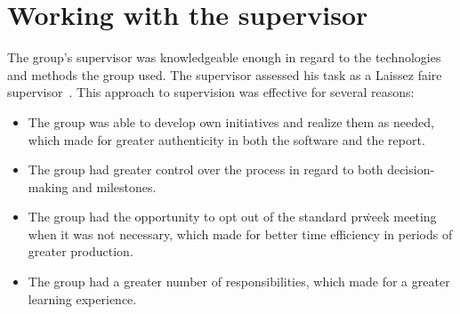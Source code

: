 \section{Working with the supervisor}\label{sec:working-with-the-supervisor}

The group's supervisor was knowledgeable enough in regard to the technologies and methods the group used.
The supervisor assessed his task as a Laissez faire supervisor~\cite{PBL}.
This approach to supervision was effective for several reasons:

\begin{itemize}
    \item The group was able to develop own initiatives and realize them as needed, which made for greater authenticity
    in both the software and the report.
    \item The group had greater control over the process in regard to both decision-making and milestones.
    \item The group had the opportunity to opt out of the standard pr\. week meeting when it was not necessary, which
    made for better time efficiency in periods of greater production.
    \item The group had a greater number of responsibilities, which made for a greater learning experience.
\end{itemize}
